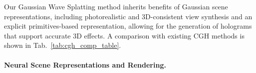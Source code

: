 
Our Gaussian Wave Splatting method inherits benefits of Gaussian scene representations, including photorealistic and 3D-consistent view synthesis and an explicit primitives-based representation, allowing for the generation of holograms that support accurate 3D effects. A comparison with existing CGH methods is shown in Tab.~\ref{tab:cgh_comp_table}.



\paragraph{\bf{Neural Scene Representations and Rendering.}}

